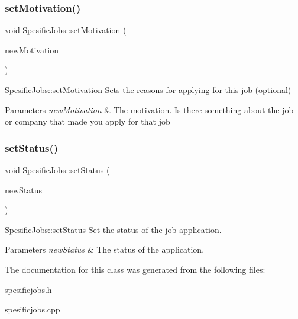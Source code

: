 \subsubsection{\texorpdfstring{set\+Motivation()}{setMotivation()}}
{\footnotesize\ttfamily void Spesific\+Jobs\+::set\+Motivation (\begin{DoxyParamCaption}\item[{Q\+String}]{new\+Motivation }\end{DoxyParamCaption})}



\hyperlink{class_spesific_jobs_a39df1f364b1ca8e3059094708f01983c}{Spesific\+Jobs\+::set\+Motivation} Sets the reasons for applying for this job (optional) 


\begin{DoxyParams}{Parameters}
{\em new\+Motivation} & The motivation. Is there something about the job or company that made you apply for that job \\
\hline
\end{DoxyParams}
\mbox{\label{class_spesific_jobs_a439307a28196221b7e3877983077812f}} 
\subsubsection{\texorpdfstring{set\+Status()}{setStatus()}}
{\footnotesize\ttfamily void Spesific\+Jobs\+::set\+Status (\begin{DoxyParamCaption}\item[{Q\+String}]{new\+Status }\end{DoxyParamCaption})}



\hyperlink{class_spesific_jobs_a439307a28196221b7e3877983077812f}{Spesific\+Jobs\+::set\+Status} Set the status of the job application. 


\begin{DoxyParams}{Parameters}
{\em new\+Status} & The status of the application. \\
\hline
\end{DoxyParams}


The documentation for this class was generated from the following files\+:\begin{DoxyCompactItemize}
\item 
spesificjobs.\+h\item 
spesificjobs.\+cpp\end{DoxyCompactItemize}
